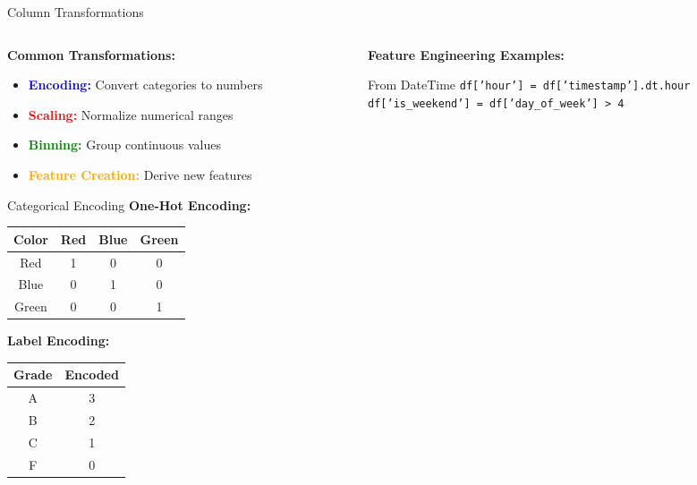 \documentclass[8pt,aspectratio=1610]{beamer}
\begin{document}
\begin{frame}{Column Transformations}
\begin{columns}[t]
\begin{column}{0.48\textwidth}
\textbf{Common Transformations:}
\begin{itemize}
\setlength{\itemsep}{1pt}
\item \textcolor{blue}{\textbf{Encoding:}} Convert categories to numbers
\item \textcolor{red}{\textbf{Scaling:}} Normalize numerical ranges
\item \textcolor{green}{\textbf{Binning:}} Group continuous values
\item \textcolor{orange}{\textbf{Feature Creation:}} Derive new features
\end{itemize}

\vspace{0.3cm}
\begin{block}{Categorical Encoding}
\textbf{One-Hot Encoding:}
\scriptsize
\begin{tabular}{|c|c|c|c|}
\hline
\textbf{Color} & \textbf{Red} & \textbf{Blue} & \textbf{Green} \\
\hline
Red & 1 & 0 & 0 \\
Blue & 0 & 1 & 0 \\
Green & 0 & 0 & 1 \\
\hline
\end{tabular}
\end{block}

\textbf{Label Encoding:}
\scriptsize
\begin{tabular}{|c|c|}
\hline
\textbf{Grade} & \textbf{Encoded} \\
\hline
A & 3 \\
B & 2 \\
C & 1 \\
F & 0 \\
\hline
\end{tabular}
\end{column}

\begin{column}{0.48\textwidth}
\textbf{Feature Engineering Examples:}
\vspace{0.2cm}

\begin{exampleblock}{From DateTime}
\scriptsize
\texttt{df['hour'] = df['timestamp'].dt.hour} \\
\texttt{df['is\_weekend'] = df['day\_of\_week'] > 4}
\end{exampleblock}


\end{column}
\end{columns}
\end{frame}
\end{document}
